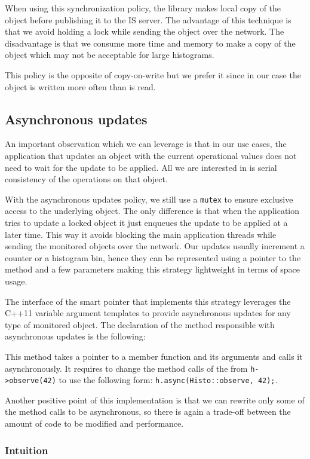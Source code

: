 When using this synchronization policy, the library makes local copy of the object before publishing it to the IS server. The advantage of this technique is that we avoid holding a lock while sending the object over the network. The disadvantage is that we consume more time and memory to make a copy of the object which may not be acceptable for large histograms.

This policy is the opposite of copy-on-write but we prefer it since in our case the object is written more often than is read.

\subsection{Asynchronous updates}

An important observation which we can leverage is that in our use cases, the application that updates an object with the current operational values does not need to wait for the update to be applied. All we are interested in is serial consistency of the operations on that object. 

With the asynchronous updates policy, we still use a \verb+mutex+ to ensure exclusive access to the underlying object. The only difference is that when the application tries to update a locked object it just enqueues the update to be applied at a later time. This way it avoids blocking the main application threads while sending the monitored objects over the network. Our updates usually increment a counter or a histogram bin, hence they can be represented using a pointer to the method and a few parameters making this strategy lightweight in terms of space usage. 

The interface of the smart pointer that implements this strategy leverages the C++11 variable argument templates to provide asynchronous updates for any type of monitored object. The declaration of the method responsible with asynchronous updates is the following:


This method takes a pointer to a member function and its arguments and calls it asynchronously. It requires to change the method calls of the from \verb+h->observe(42)+ to use the following form: \verb+h.async(Histo::observe, 42);+.

Another positive point of this implementation is that we can rewrite only some of the method calls to be asynchronous, so there is again a trade-off between the amount of code to be modified and performance.

\subsubsection*{Intuition}

